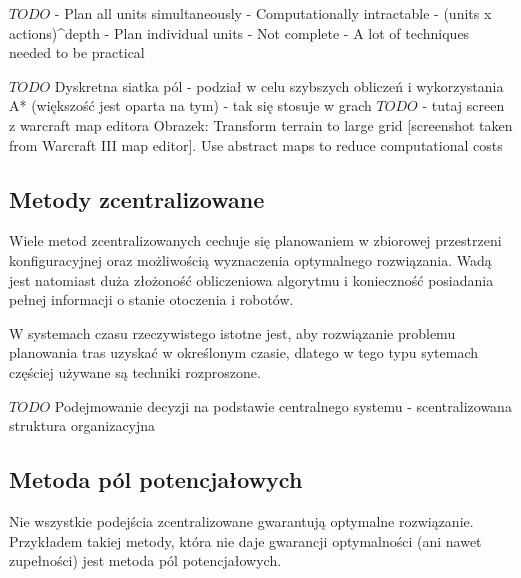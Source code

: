 $TODO$
- Plan all units simultaneously
	- Computationally intractable
	- (units x actions)^depth
- Plan individual units
	- Not complete
	- A lot of techniques needed to be practical

$TODO$
Dyskretna siatka pól - podział w celu szybszych obliczeń i wykorzystania A* (większość jest oparta na tym) - tak się stosuje w grach
$TODO$ - tutaj screen z warcraft map editora
Obrazek: Transform terrain to large grid [screenshot taken from Warcraft III map editor]. \cite{hierpathfindinginrts}
Use abstract maps to reduce computational costs

\subsection{Metody zcentralizowane}
Wiele metod zcentralizowanych cechuje się planowaniem w zbiorowej przestrzeni konfiguracyjnej oraz możliwością wyznaczenia optymalnego rozwiązania.
Wadą jest natomiast duża złożoność obliczeniowa algorytmu i konieczność posiadania pełnej informacji o stanie otoczenia i robotów.

W systemach czasu rzeczywistego istotne jest, aby rozwiązanie problemu planowania tras uzyskać w określonym czasie, dlatego w tego typu sytemach częściej używane są techniki rozproszone.

$TODO$ Podejmowanie decyzji na podstawie centralnego systemu - scentralizowana struktura organizacyjna

\subsection{Metoda pól potencjałowych}
Nie wszystkie podejścia zcentralizowane gwarantują optymalne rozwiązanie. Przykładem takiej metody, która nie daje gwarancji optymalności (ani nawet zupełności) jest metoda pól potencjałowych.

